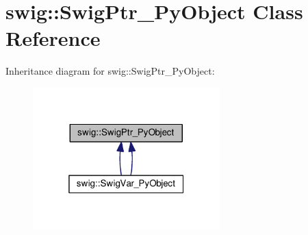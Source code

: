 \hypertarget{classswig_1_1SwigPtr__PyObject}{}\section{swig\+:\+:Swig\+Ptr\+\_\+\+Py\+Object Class Reference}
\label{classswig_1_1SwigPtr__PyObject}


Inheritance diagram for swig\+:\+:Swig\+Ptr\+\_\+\+Py\+Object\+:
\nopagebreak
\begin{figure}[H]
\begin{center}
\leavevmode
\includegraphics[width=205pt]{classswig_1_1SwigPtr__PyObject__inherit__graph}
\end{center}
\end{figure}
